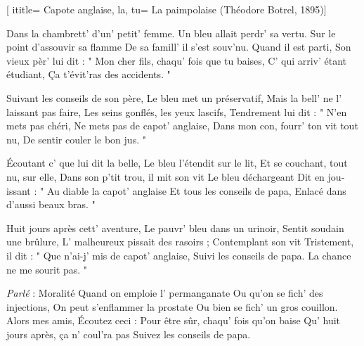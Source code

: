  [
ititle= {Capote anglaise, la},
tu= {La paimpolaise \footnotemark (Théodore Botrel, 1895)}]


\beginverse
Dans la chambrett' d'un' petit' femme.
Un bleu allait perdr' sa vertu.
Sur le point d'assouvir sa flamme
De sa famill' il s'est souv'nu.
Quand il est parti,
Son vieux pèr' lui dit :
" Mon cher fils, chaqu' fois que tu baises,
C' qui arriv' étant étudiant,
 {Ça t'évit'ras des accidents. "}
\endverse

\beginverse
Suivant les conseils de son père,
Le bleu met un préservatif,
Mais la bell' ne l' laissant pas faire,
Les seins gonflés, les yeux lascifs,
Tendrement lui dit :
" N'en mets pas chéri,
Ne mets pas de capot' anglaise,
Dans mon con, fourr' ton vit tout nu,
 {De sentir couler le bon jus. "}
\endverse

\beginverse
Écoutant c' que lui dit la belle,
Le bleu l'étendit sur le lit,
Et se couchant, tout nu, sur elle,
Dans son p'tit trou, il mit son vit
Le bleu déchargeant
Dit en jou-issant :
" Au diable la capot' anglaise
Et tous les conseils de papa,
 {Enlacé dans d'aussi beaux bras. "}
\endverse

\beginverse
Huit jours après cett' aventure,
Le pauvr' bleu dans un urinoir,
Sentit soudain une brûlure,
L' malheureux pissait des rasoirs ;
Contemplant son vit
Tristement, il dit :
" Que n'ai-j' mis de capot' anglaise,
Suivi les conseils de papa.
 { La chance ne me sourit pas. "}
\endverse

\beginverse
\textit {Parlé} : Moralité
Quand on emploie l' permanganate
Ou qu'on se fich' des injections,
On peut s'enflammer la prostate
Ou bien se fich' un gros couillon.
Alors mes amis,
Écoutez ceci :
Pour être sûr, chaqu' fois qu'on baise
Qu' huit jours après, ça n' coul'ra pas
 {Suivez les conseils de papa.}
\endverse

\endsong